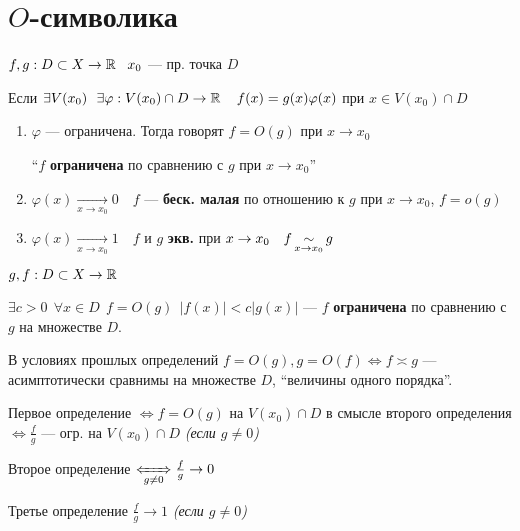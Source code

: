     \section{$O$-символика}
    \begin{definition}
        $f,g:D\subset X\to\operatorname*{\mathbb{R}} \ \ x_0$ --- пр. точка $D$

        Если $\exists V(x_0) \ \ \exists \varphi:V(x_0)\cap D\to\operatorname*{\mathbb{R}} \quad f(x)=g(x)\varphi(x)$ при $x\in V(x_0)\cap D$
        \begin{enumerate}
            \item $\varphi$ --- ограничена. Тогда говорят $f=O(g)$ при $x\to x_0$
            
            ``$f$ \textbf{ограничена} по сравнению с $g$ при $x\to x_0$''
            \item $\varphi(x)\xrightarrow[x\to x_0]{}0 \quad f$ --- \textbf{беск. малая} по отношению к $g$ при $x\to x_0$, $f=o(g)$
            \item $\varphi(x)\xrightarrow[x\to x_0]{}1 \quad f$ и $g$ \textbf{экв.} при $x\to x_0 \quad f\operatorname*{\sim}\limits_{x\to x_0} g$ 
        \end{enumerate}

        $g, f:D\subset X\to\operatorname*{\mathbb{R}}$
    \end{definition}
    \begin{definition}
        $\exists c>0 \ \ \forall x\in D \ \ f=O(g) \ \ |f(x)|<c|g(x)|$ --- $f$ \textbf{ограничена} по сравнению с $g$ на множестве $D$.
    \end{definition}
    \begin{definition}
        В условиях прошлых определений $f=O(g), g=O(f) \Leftrightarrow f\asymp g$ --- асимптотически сравнимы на множестве $D$, ``величины одного порядка''.
    \end{definition}
    \begin{remark}
        Первое определение $\Leftrightarrow f=O(g)$ на $V(x_0)\cap D$ в смысле второго определения $\Leftrightarrow \frac{f}{g}$ --- огр. на $V(x_0)\cap D$ \textit{(если $g\not=0$)}

        Второе определение $\xLeftrightarrow[g\not=0]{} \frac{f}{g}\to 0$

        Третье определение $\frac{f}{g}\to 1$ \textit{(если $g\not=0$)}
    \end{remark}
